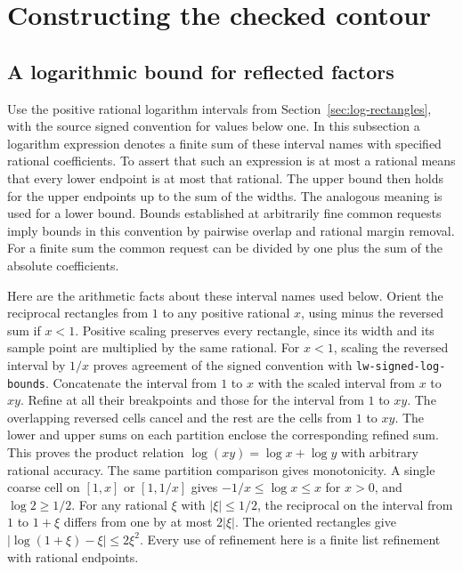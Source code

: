 \documentclass[11pt]{amsart}
\theoremstyle{definition}
\theoremstyle{remark}
\numberwithin{equation}{section}
\newcommand{\code}[1]{\nolinkurl{#1}}
\begin{document}
\section{Constructing the checked contour}
\label{sec:construct-cover}

\subsection{A logarithmic bound for reflected factors}

Use the positive rational logarithm intervals from
Section~\ref{sec:log-rectangles}, with the source signed convention
for values below one. In this subsection a logarithm expression
denotes a finite sum of these interval names with specified rational
coefficients. To assert that such an expression is at most a
rational means that every lower endpoint is at most that rational.
The upper bound then holds for the upper endpoints up to the
sum of the widths. The analogous meaning is used for a lower
bound. Bounds established at arbitrarily fine common requests
imply bounds in this convention by pairwise overlap and rational
margin removal. For a finite sum the common request can be
divided by one plus the sum of the absolute coefficients.

Here are the arithmetic facts about these interval names used
below. Orient the reciprocal rectangles from $1$ to any positive
rational $x$, using minus the reversed sum if $x<1$.
Positive scaling preserves every rectangle, since its width and
its sample point are multiplied by the same rational.
For $x<1$, scaling the reversed interval by $1/x$ proves
agreement of the signed convention with
\code{lw-signed-log-bounds}. Concatenate the interval from $1$
to $x$ with the scaled interval from $x$ to $xy$. Refine at all
their breakpoints and those for the interval from $1$ to $xy$.
The overlapping reversed cells cancel and the rest are the cells
from $1$ to $xy$. The lower and upper sums on each partition
enclose the corresponding refined sum. This proves the
product relation $\log(xy)=\log x+\log y$ with arbitrary
rational accuracy. The same partition comparison gives
monotonicity. A single coarse cell on $[1,x]$ or $[1,1/x]$ gives
$-1/x\le\log x\le x$ for $x>0$, and $\log 2\ge1/2$.
For any rational $\xi$ with $|\xi|\le1/2$, the reciprocal
on the interval from $1$ to $1+\xi$ differs from one by at
most $2|\xi|$. The oriented rectangles give
$|\log(1+\xi)-\xi|\le 2\xi^2$. Every use of refinement here
is a finite list refinement with rational endpoints.
\end{document}
